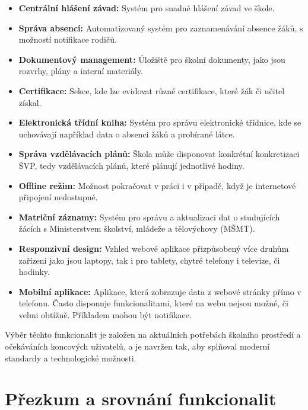 \documentclass[FM,Proj]{tulthesis}
\begin{document}
\begin{itemize}
    \item \textbf{Centrální hlášení závad:} Systém pro snadné hlášení závad ve škole.

    \item \textbf{Správa absencí:} Automatizovaný systém pro zaznamenávání absence žáků, s možností notifikace rodičů.
    
    \item \textbf{Dokumentový management:} Úložiště pro školní dokumenty, jako jsou rozvrhy, plány a interní materiály.
    
    \item \textbf{Certifikace:} Sekce, kde lze evidovat různé certifikace, které žák či učitel získal.

    \item \textbf{Elektronická třídní kniha:} Systém pro správu elektronické třídnice, kde se uchovávají například data 
    o absenci žáků a probírané látce.

    \item \textbf{Správa vzdělávacích plánů:} Škola může disponovat konkrétní konkretizaci ŠVP, tedy vzdělávacích plánů,
    které plánují jednotlivé hodiny.
    
    \item \textbf{Offline režim:} Možnost pokračovat v práci i v případě, když je internetové připojení nedostupné.

    \item \textbf{Matriční záznamy:} Systém pro správu a aktualizaci dat o studujících žácích s Ministerstvem školství,
    mládeže a tělovýchovy (MŠMT).

    \item \textbf{Responzivní design:} Vzhled webové aplikace přizpůsobený více druhům zařízení jako jsou laptopy,
    tak i pro tablety, chytré telefony i televize, či hodinky.

    \item \textbf{Mobilní aplikace:} Aplikace, která zobrazuje data z webové stránky přímo v telefonu. Často
    disponuje funkcionalitami, které na webu nejsou možné, či velmi obtížně. Příkladem mohou být notifikace.

\end{itemize}

Výběr těchto funkcionalit je založen na aktuálních potřebách školního prostředí a očekáváních koncových uživatelů,
a je navržen tak, aby splňoval moderní standardy a technologické možnosti.

\section{Přezkum a srovnání funkcionalit}
\end{document}
